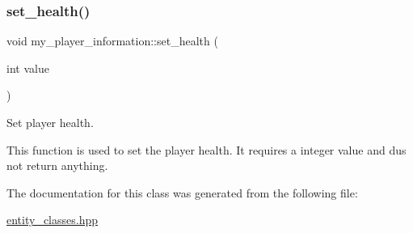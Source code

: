\subsubsection{\texorpdfstring{set\+\_\+health()}{set\_health()}}
{\footnotesize\ttfamily void my\+\_\+player\+\_\+information\+::set\+\_\+health (\begin{DoxyParamCaption}\item[{int}]{value }\end{DoxyParamCaption})\hspace{0.3cm}{\ttfamily [inline]}}



Set player health. 

This function is used to set the player health. It requires a integer value and dus not return anything. 

The documentation for this class was generated from the following file\+:\begin{DoxyCompactItemize}
\item 
\hyperlink{entity__classes_8hpp}{entity\+\_\+classes.\+hpp}\end{DoxyCompactItemize}
